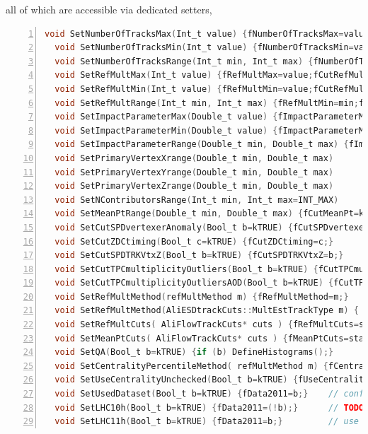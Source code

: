 \documentclass[a4paper]{book}
\numberwithin{equation}{subsection}
\begin{document}
  all of which are accessible via dedicated setters,
\begin{lstlisting}[language=C, numbers=left]
  void SetNumberOfTracksMax(Int_t value) {fNumberOfTracksMax=value;fCutNumberOfTracks=kTRUE;}
  void SetNumberOfTracksMin(Int_t value) {fNumberOfTracksMin=value;fCutNumberOfTracks=kTRUE;}
  void SetNumberOfTracksRange(Int_t min, Int_t max) {fNumberOfTracksMin=min;fNumberOfTracksMax=max;fCutNumberOfTracks=kTRUE;}
  void SetRefMultMax(Int_t value) {fRefMultMax=value;fCutRefMult=kTRUE;}
  void SetRefMultMin(Int_t value) {fRefMultMin=value;fCutRefMult=kTRUE;}
  void SetRefMultRange(Int_t min, Int_t max) {fRefMultMin=min;fRefMultMax=max;fCutRefMult=kTRUE;}
  void SetImpactParameterMax(Double_t value) {fImpactParameterMax=value;fCutImpactParameter=kTRUE;}
  void SetImpactParameterMin(Double_t value) {fImpactParameterMin=value;fCutImpactParameter=kTRUE;}
  void SetImpactParameterRange(Double_t min, Double_t max) {fImpactParameterMin=min;fImpactParameterMax=max;fCutImpactParameter=kTRUE;}
  void SetPrimaryVertexXrange(Double_t min, Double_t max)
  void SetPrimaryVertexYrange(Double_t min, Double_t max)
  void SetPrimaryVertexZrange(Double_t min, Double_t max)
  void SetNContributorsRange(Int_t min, Int_t max=INT_MAX) 
  void SetMeanPtRange(Double_t min, Double_t max) {fCutMeanPt=kTRUE; fMeanPtMax=max; fMeanPtMin=min;}
  void SetCutSPDvertexerAnomaly(Bool_t b=kTRUE) {fCutSPDvertexerAnomaly=b;}
  void SetCutZDCtiming(Bool_t c=kTRUE) {fCutZDCtiming=c;}
  void SetCutSPDTRKVtxZ(Bool_t b=kTRUE) {fCutSPDTRKVtxZ=b;}
  void SetCutTPCmultiplicityOutliers(Bool_t b=kTRUE) {fCutTPCmultiplicityOutliers=b;}  
  void SetCutTPCmultiplicityOutliersAOD(Bool_t b=kTRUE) {fCutTPCmultiplicityOutliersAOD=b;}
  void SetRefMultMethod(refMultMethod m) {fRefMultMethod=m;}
  void SetRefMultMethod(AliESDtrackCuts::MultEstTrackType m) { fRefMultMethodAliESDtrackCuts=m; 
  void SetRefMultCuts( AliFlowTrackCuts* cuts ) {fRefMultCuts=static_cast<AliFlowTrackCuts*>(cuts->Clone());}
  void SetMeanPtCuts( AliFlowTrackCuts* cuts ) {fMeanPtCuts=static_cast<AliFlowTrackCuts*>(cuts->Clone());}
  void SetQA(Bool_t b=kTRUE) {if (b) DefineHistograms();}
  void SetCentralityPercentileMethod( refMultMethod m) {fCentralityPercentileMethod=m;}
  void SetUseCentralityUnchecked(Bool_t b=kTRUE) {fUseCentralityUnchecked=b;}
  void SetUsedDataset(Bool_t b=kTRUE) {fData2011=b;}    // confusing name, better use different interface
  void SetLHC10h(Bool_t b=kTRUE) {fData2011=(!b);}      // TODO let cut object determine runnumber and period
  void SetLHC11h(Bool_t b=kTRUE) {fData2011=b;}         // use this only as 'manual override'\end{lstlisting}
\end{document}
